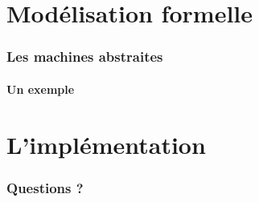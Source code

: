 \documentclass[11pt,a4paper,xcolor=table]{beamer} %
\begin{document}
%
%
\frame{\tableofcontents}

\section{Modélisation formelle}
\begin{frame}
\frametitle{Les machines abstraites}
\framesubtitle{Un exemple}

\end{frame}

\section{L'implémentation}


\begin{frame}
\frametitle{Questions ?}

\end{frame}
\end{document}
